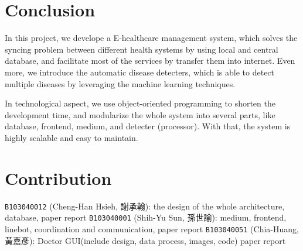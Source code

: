 \documentclass{article}
\begin{document}
\section{Conclusion}
\label{sec:conclusion}
In this project, we develope a E-healthcare management system, which solves 
the syncing problem between different health systems by using local and 
central database, and facilitate most of the services by transfer them into 
internet. Even more, we introduce the automatic disease detecters, which 
is able to detect multiple diseases by leveraging the machine learning 
techniques. 

In technological aspect, we use object-oriented programming to shorten the 
development time, and modularize the whole system into several parts, like 
database, frontend, medium, and detecter (processor). With that, the system 
is highly scalable and easy to maintain. 

\section{Contribution}
\label{sec:contribution}

\texttt{B103040012} (Cheng-Han Hsieh, 謝承翰): the design of the whole architecture, database, paper report
\texttt{B103040001} (Shih-Yu Sun, 孫世諭): medium, frontend, linebot, coordination and communication, paper report
\texttt{B103040051} (Chia-Huang, 黃嘉彥): Doctor GUI(include design, data process, images, code) paper report
\end{document}

